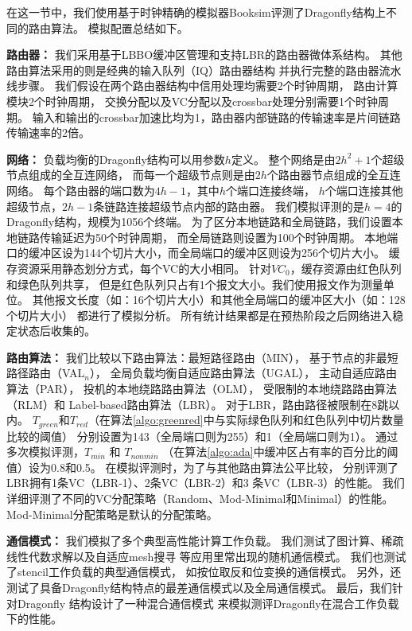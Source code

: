 在这一节中，我们使用基于时钟精确的模拟器Booksim评测了Dragonfly结构上不同的路由算法。
模拟配置总结如下。

\textbf{路由器：}
我们采用基于LBBO缓冲区管理和支持LBR的路由器微体系结构。
其他路由算法采用的则是经典的输入队列（IQ）路由器结构
并执行完整的路由器流水线步骤。
我们假设在两个路由器结构中信用处理均需要2个时钟周期，
路由计算模块2个时钟周期，
交换分配以及VC分配以及crossbar处理分别需要1个时钟周期。
输入和输出的crossbar加速比均为1，路由器内部链路的传输速率是片间链路传输速率的2倍。

\textbf{网络：}
负载均衡的Dragonfly结构可以用参数$h$定义。
整个网络是由$2h^2+1$个超级节点组成的全互连网络，
而每一个超级节点则是由$2h$个路由器节点组成的全互连网络。
每个路由器的端口数为$4h-1$，其中$h$个端口连接终端，
$h$个端口连接其他超级节点，$2h-1$条链路连接超级节点内部的路由器。
我们模拟评测的是$h=4$的Dragonfly结构，规模为1056个终端。
为了区分本地链路和全局链路，我们设置本地链路传输延迟为50个时钟周期，
而全局链路则设置为100个时钟周期。
本地端口的缓冲区设为144个切片大小，而全局端口的缓冲区则设为256个切片大小。
缓存资源采用静态划分方式，每个VC的大小相同。
针对$VC_0$，缓存资源由红色队列和绿色队列共享，
但是红色队列只占有1个报文大小。我们使用报文作为测量单位。
其他报文长度（如：16个切片大小）和其他全局端口的缓冲区大小（如：128个切片大小）
都进行了模拟分析。
所有统计结果都是在预热阶段之后网络进入稳定状态后收集的。

\textbf{路由算法：}
我们比较以下路由算法：最短路径路由（MIN），
基于节点的非最短路径路由（VAL$_n$），
全局负载均衡自适应路由算法（UGAL），
主动自适应路由算法（PAR），
投机的本地绕路路由算法（OLM），
受限制的本地绕路路由算法（RLM）和
Label-based路由算法（LBR）。
对于LBR，路由路径被限制在8跳以内。
$T_{green}$和$T_{red}$（在算法\ref{algo:greenred}中与实际绿色队列和红色队列中切片数量比较的阈值）
分别设置为143（全局端口则为255）和1（全局端口则为1）。
通过多次模拟评测，$T_{min}$ 和 $T_{nonmin}$
（在算法\ref{algo:ada}中缓冲区占有率的百分比的阈值）设为0.8和0.5。
在模拟评测时，为了与其他路由算法公平比较，
分别评测了LBR拥有1条VC（LBR-1）、2条VC（LBR-2）和3 条VC（LBR-3）的性能。
我们详细评测了不同的VC分配策略（Random、Mod-Minimal和Minimal）的性能。
Mod-Minimal分配策略是默认的分配策略。

\textbf{通信模式：}
我们模拟了多个典型高性能计算工作负载。
我们测试了图计算、稀疏线性代数求解以及自适应mesh搜寻
等应用里常出现的随机通信模式。
我们也测试了stencil工作负载的典型通信模式，
如按位取反和位变换的通信模式。
另外，还测试了具备Dragonfly结构特点的最差通信模式以及全局通信模式。
最后，我们针对Dragonfly 结构设计了一种混合通信模式
来模拟测评Dragonfly在混合工作负载下的性能。

